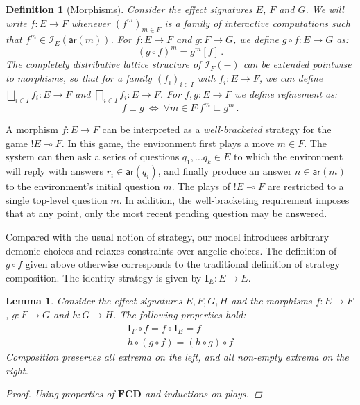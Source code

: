 \documentclass[draft,11pt]{report}
\newtheorem{definition}{Definition}
\newtheorem{lemma}{Lemma}
\newcommand{\kw}[1]{\ensuremath{ \mathsf{#1} }}
\newcommand{\bdot}{\boldsymbol{\cdot}}
\begin{document}
\begin{definition}[Morphisms]
Consider the effect signatures $E$, $F$ and $G$.
We will write $f : E \rightarrow F$
whenever $(f^m)_{m \in F}$ is a family of interactive computations
such that $f^m \in \mathcal{I}_E(\kw{ar}(m))$.
For $f : E \rightarrow F$ and $g : F \rightarrow G$,
we define $g \circ f : E \rightarrow G$ as:
\[ (g \circ f)^m = g^m[f] \,. \]
The completely distributive lattice structure
of $\mathcal{I}_F(-)$ can be extended pointwise
to morphisms,
so that for a family $(f_i)_{i \in I}$
with $f_i : E \rightarrow F$,
we can define
$\bigsqcup_{i \in I} f_i : E \rightarrow F$ and
$\bigsqcap_{i \in I} f_i : E \rightarrow F$.
For $f, g : E \rightarrow F$
we define refinement as:
\[
    f \sqsubseteq g \: \Leftrightarrow \:
    \forall m \in F \bdot f^m \sqsubseteq g^m \,.
\]
\end{definition}

A morphism $f : E \rightarrow F$
can be interpreted as a \emph{well-bracketed} strategy for the game
${!E} \multimap F$.
In this game,
the environment first plays a move $m \in F$.
The system can then ask a series of questions
$q_1, \ldots q_k \in E$
to which the environment will reply with
answers $r_i \in \kw{ar}(q_i)$,
and finally produce an answer $n \in \kw{ar}(m)$
to the environment's initial question $m$.
The plays of ${!E} \multimap F$
are restricted to a single top-level question $m$.
In addition, the well-bracketing requirement
imposes that at any point,
only the most recent pending question
may be answered.

Compared with the usual notion of strategy,
our model introduces arbitrary demonic choices and
relaxes constraints over angelic choices.
The definition of $g \circ f$ given above
otherwise corresponds to the traditional
definition of strategy composition.
The identity strategy is given by $\mathbf{I}_E : E \rightarrow E$.

\begin{lemma}
Consider the effect signatures $E, F, G, H$ and
the morphisms
$f : E \rightarrow F$,
$g : F \rightarrow G$ and
$h : G \rightarrow H$.
The following properties hold:
\begin{gather*}
  \mathbf{I}_F \circ f = f \circ \mathbf{I}_E = f \\
  h \circ (g \circ f) = (h \circ g) \circ f
\end{gather*}
Composition preserves all extrema on the left,
and all non-empty extrema on the right.
\begin{proof}
Using properties of $\mathbf{FCD}$
and inductions on plays.
\end{proof}
\end{lemma}
\end{document}
